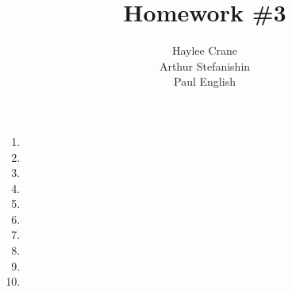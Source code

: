 \documentclass[11pt, oneside]{article}
\title{Homework \#3}
\author{
Haylee Crane \\
Arthur Stefanishin\\
Paul English
}
\begin{document}
\maketitle

\begin{enumerate}

\item 
\item 
\item 
\item 
\item 
\item 
\item 
\item 
\item 
\item 

\end{enumerate}
\end{document}
